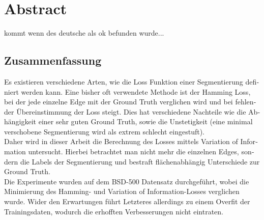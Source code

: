 \begingroup
\let\clearpage\relax
\let\cleardoublepage\relax
\let\cleardoublepage\relax

\chapter*{Abstract}
kommt wenn des deutsche als ok befunden wurde...


\vfill

\begin{otherlanguage}{ngerman}
\chapter*{Zusammenfassung}
Es existieren verschiedene Arten, wie die Loss Funktion einer Segmentierung definiert werden kann. Eine bisher oft verwendete Methode ist der Hamming Loss, bei der jede einzelne Edge mit der Ground Truth verglichen wird und bei fehlender Übereinstimmung der Loss steigt. Dies hat verschiedene Nachteile wie die Abhängigkeit einer sehr guten Ground Truth, sowie die Unstetigkeit (eine minimal verschobene Segmentierung wird als extrem schlecht eingestuft). \\
Daher wird in dieser Arbeit die Berechnung des Losses mittels Variation of Information untersucht. Hierbei betrachtet man nicht mehr die einzelnen Edges, sondern die Labels der Segmentierung und bestraft flächenabhängig Unterschiede zur Ground Truth. \\
Die Experimente wurden auf dem BSD-500 Datensatz durchgeführt, wobei die Minimierung des Hamming- und Variation of Information-Losses verglichen wurde. Wider den Erwartungen führt Letzteres allerdings zu einem Overfit der Trainingsdaten, wodurch die erhofften Verbesserungen nicht eintraten.

\end{otherlanguage}

\endgroup			

\vfill